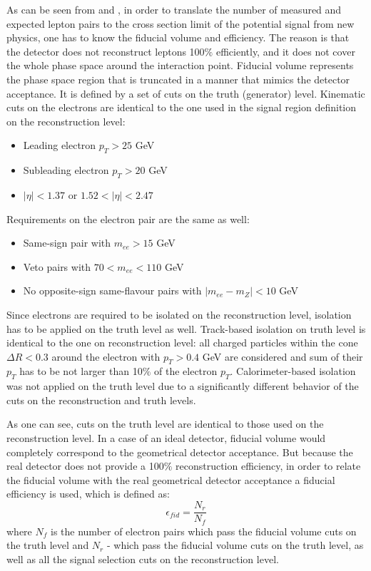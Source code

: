 As can be seen from  and , in order to translate the number of measured and expected lepton pairs 
to the cross section limit of the potential signal from new physics, one has to know the fiducial volume and efficiency.
The reason is that the detector does not reconstruct leptons 100$\%$ efficiently, and it does not cover the whole phase space around the interaction point.
Fiducial volume represents the phase space region that is truncated in a manner that mimics the detector acceptance.
It is defined by a set of cuts on the truth (generator) level. 
Kinematic cuts on the electrons are identical to the one used in the signal region definition on the reconstruction level:
\begin{itemize}
 \item Leading electron $p_T > 25$ GeV
 \item Subleading electron $p_T > 20$ GeV
 \item $|\eta|<1.37$ or $1.52<|\eta|<2.47$
\end{itemize}
Requirements on the electron pair are the same as well:
\begin{itemize}
 \item Same-sign pair with $m_{ee} > 15$ GeV
 \item Veto pairs with $70 < m_{ee} < 110$ GeV
 \item No opposite-sign same-flavour pairs with $|m_{ee} - m_{Z}| < 10$ GeV
\end{itemize}
Since electrons are required to be isolated on the reconstruction level, isolation has to be applied on the truth level as well.
Track-based isolation on truth level is identical to the one on reconstruction level:
all charged particles within the cone $\Delta R < 0.3$ around the electron with $p_T > 0.4$ GeV are considered and
sum of their $p_T$ has to be not larger than 10$\%$ of the electron $p_T$.
Calorimeter-based isolation was not applied on the truth level due to a significantly different behavior of the cuts on the reconstruction and truth levels.

As one can see, cuts on the truth level are identical to those used on the reconstruction level.
In a case of an ideal detector, fiducial volume would completely correspond to the geometrical detector acceptance.
But because the real detector does not provide a 100$\%$ reconstruction efficiency, in order to relate the fiducial volume with the real geometrical detector acceptance
a fiducial efficiency is used, which is defined as:
\begin{equation}
 \epsilon_{fid} = \dfrac{N_r}{N_f}
\end{equation}
where $N_f$ is the number of electron pairs which pass the fiducial volume cuts on the truth level and $N_r$ - which pass the fiducial volume cuts on the truth level, 
as well as all the signal selection cuts on the reconstruction level.

